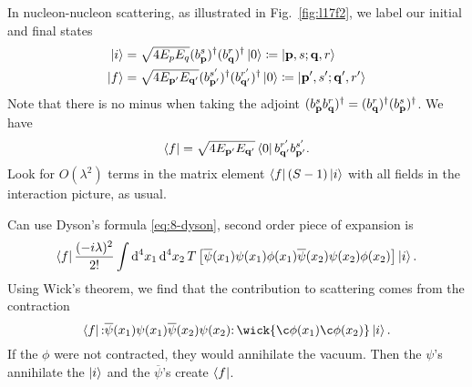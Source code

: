 \begin{example}[$\psi\psi \to \psi\psi$]
  In nucleon-nucleon scattering, as illustrated in Fig.~\ref{fig:l17f2}, we label our initial and final states
  \begin{align}
    \ket{i} &= \sqrt{4 E_p E_{q}} (b_{\vb{p}}^{s})^{\dagger} (b_{\vb{q}}^{r})^{\dagger} \ket{0} \coloneqq \ket{\vb{p}, s; \vb{q}, r} \\
    \ket{f} &= \sqrt{4 E_{\vb{p}'} E_{\vb{q}'}} (b_{\vb{p}'}^{s'})^{\dagger} (b_{\vb{q}'}^{r'})^{\dagger} \ket{0} \coloneqq \ket{\vb{p}', s' ; \vb{q}', r'}
  \end{align}
  Note that there is no minus when taking the adjoint $(b^{s} _{\vb{p}} b_{\vb{q}}^{r})^{\dagger} = (b_{\vb{q}}^{r})^{\dagger} (b_{\vb{p}}^{s})^{\dagger}$.
  We have 
  \begin{equation}
    \bra{f} = \sqrt{4 E_{\vb{p}'} E_{\vb{q}'}} \bra{0} b_{\vb{q}'}^{r'} b_{\vb{p}'}^{s'}.
  \end{equation}
  Look for $O(\lambda^2)$ terms in the matrix element $\bra{f}(S-1)\ket{i}$ with all fields in the interaction picture, as usual.

  Can use Dyson's formula \eqref{eq:8-dyson}, second order piece of expansion is
  \begin{equation}
    \label{eq:17-0}
    \bra{f} \frac{(-i\lambda)^2}{2!} \int \dd[4]{x_1} \dd[4]{x_2} T \left[ \overline{\psi}(x_1) \psi(x_1) \phi(x_1) \overline{\psi}(x_2) \psi(x_2) \phi(x_2) \right] \ket{i}.
  \end{equation}
  Using Wick's theorem, we find that the contribution to scattering comes from the contraction
  \begin{equation}
    \bra{f} \normalorder{\overline{\psi}(x_1) \psi(x_1) \overline{\psi} (x_2) \psi(x_2)} \wick{\c \phi(x_1) \c \phi(x_2)} \ket{i}.
  \end{equation}
  If the $\phi$ were not contracted, they would annihilate the vacuum.
  Then the $\psi$'s annihilate the $\ket{i}$ and the $\overline{\psi}$'s create $\bra{f}$.


\end{example}
